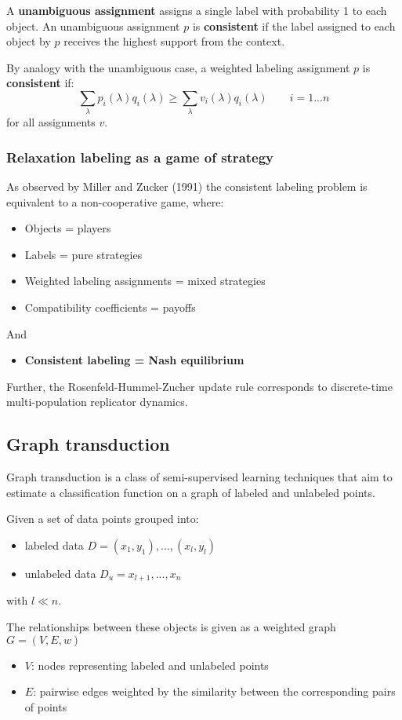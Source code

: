 A \textbf{unambiguous assignment} assigns a single label with probability 1 to each
object. An unambiguous assignment $p$ is \textbf{consistent} if the label assigned to
each object by $p$ receives the highest support from the context.

By analogy with the unambiguous case, a weighted labeling assignment $p$ is
\textbf{consistent} if:
$$ \sum_\lambda p_i(\lambda)q_i(\lambda) \ge \sum_\lambda v_i(\lambda)q_i(\lambda)
\qquad i= 1...n $$
for all assignments $v$.

\subsubsection{Relaxation labeling as a game of strategy}
As observed by Miller and Zucker (1991) the consistent labeling problem is equivalent
to a non-cooperative game, where:
\begin{itemize}
\item Objects = players
\item Labels = pure strategies
\item Weighted labeling assignments = mixed strategies
\item Compatibility coefficients = payoffs
\end{itemize}
And
\begin{itemize}
\item \textbf{Consistent labeling = Nash equilibrium}
\end{itemize}

Further, the Rosenfeld-Hummel-Zucher update rule corresponds to discrete-time
multi-population replicator dynamics.

\subsection{Graph transduction}
Graph transduction is a class of semi-supervised learning techniques that aim to
estimate a classification function on a graph of labeled and unlabeled points.

Given a set of data points grouped into:
\begin{itemize}
\item labeled data $D = {(x_1, y_1), ..., (x_l, y_l)}$
\item unlabeled data $D_u = {x_{l+1}, ..., x_n}$
\end{itemize}
with $l \ll n$.

The relationships between these objects is given as a weighted graph $G = (V,E,w)$
\begin{itemize}
\item $V$: nodes representing labeled and unlabeled points
\item $E$: pairwise edges weighted by the similarity between the corresponding pairs
  of points
\end{itemize}

